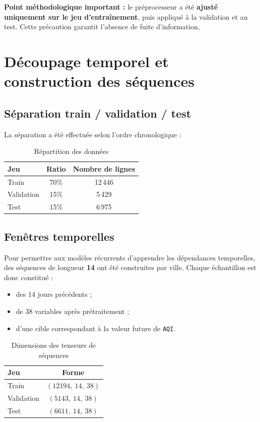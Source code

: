 \documentclass[11pt,a4paper]{article}
\newcommand{\aqi}{\texttt{AQI}}
\begin{document}
\begin{resultbox}
\textbf{Point méthodologique important :} le préprocesseur a été \textbf{ajusté uniquement sur le jeu d'entraînement},
puis appliqué à la validation et au test. Cette précaution garantit l'absence de fuite d'information.
\end{resultbox}

\section{Découpage temporel et construction des séquences}

\subsection{Séparation train / validation / test}
La séparation a été effectuée selon l'ordre chronologique :

\begin{table}[H]
\centering
\caption{Répartition des données}
\begin{tabular}{lcc}
\toprule
\textbf{Jeu} & \textbf{Ratio} & \textbf{Nombre de lignes} \\
\midrule
Train & 70\% & 12\,446 \\
Validation & 15\% & 5\,429 \\
Test & 15\% & 6\,975 \\
\bottomrule
\end{tabular}
\end{table}

\subsection{Fenêtres temporelles}
Pour permettre aux modèles récurrents d'apprendre les dépendances temporelles, des séquences de longueur \textbf{14} ont été construites
par ville. Chaque échantillon est donc constitué :

\begin{itemize}
    \item des 14 jours précédents ;
    \item de 38 variables après prétraitement ;
    \item d'une cible correspondant à la valeur future de \aqi.
\end{itemize}

\begin{table}[H]
\centering
\caption{Dimensions des tenseurs de séquences}
\begin{tabular}{lc}
\toprule
\textbf{Jeu} & \textbf{Forme} \\
\midrule
Train & $(12194,\ 14,\ 38)$ \\
Validation & $(5143,\ 14,\ 38)$ \\
Test & $(6611,\ 14,\ 38)$ \\
\bottomrule
\end{tabular}
\end{table}
\end{document}
